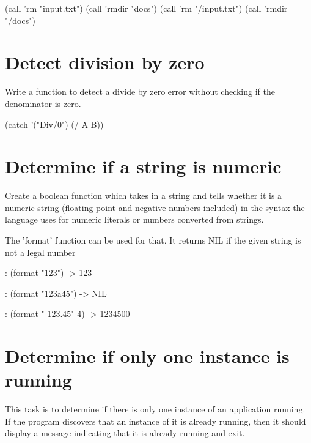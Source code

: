 \begin{wideverbatim}

(call 'rm "input.txt")
(call 'rmdir "docs")
(call 'rm "/input.txt")
(call 'rmdir "/docs")

\end{wideverbatim}

\pagebreak{}
\section*{Detect division by zero}

Write a function to detect a divide by zero error without checking if
the denominator is zero.

\begin{wideverbatim}

(catch '("Div/0") (/ A B))

\end{wideverbatim}

\pagebreak{}
\section*{Determine if a string is numeric}

Create a boolean function which takes in a string and tells whether it
is a numeric string (floating point and negative numbers included) in
the syntax the language uses for numeric literals or numbers converted
from strings.

\begin{wideverbatim}

  The 'format' function can be used for that. It returns NIL if the
  given string is not a legal number

: (format "123")
-> 123

: (format "123a45")
-> NIL

: (format "-123.45" 4)
-> 1234500

\end{wideverbatim}

\pagebreak{}
\section*{Determine if only one instance is running}

This task is to determine if there is only one instance of an
application running. If the program discovers that an instance of it is
already running, then it should display a message indicating that it is
already running and exit.


